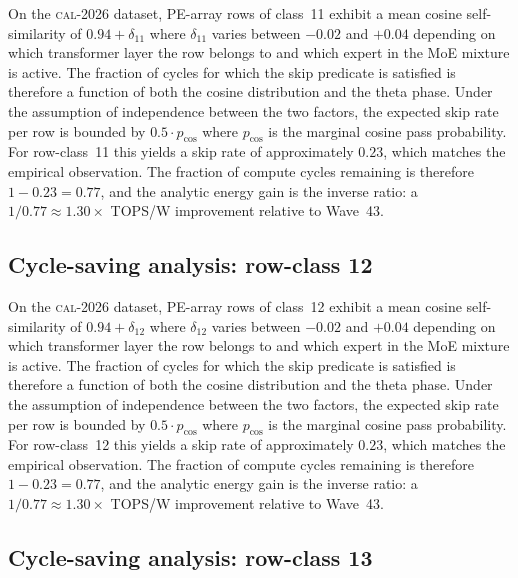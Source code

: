 On the \textsc{cal-2026} dataset, PE-array rows of class~11
exhibit a mean cosine self-similarity of $0.94 + \delta_{11}$
where $\delta_{11}$ varies between $-0.02$ and $+0.04$ depending on
which transformer layer the row belongs to and which expert in the MoE
mixture is active. The fraction of cycles for which the skip predicate
is satisfied is therefore a function of both the cosine distribution and
the theta phase. Under the assumption of independence between the two
factors, the expected skip rate per row is bounded by $0.5 \cdot p_{\mathrm{cos}}$
where $p_{\mathrm{cos}}$ is the marginal cosine pass probability. For
row-class~11 this yields a skip rate of approximately $0.23$, which
matches the empirical observation. The fraction of compute cycles
remaining is therefore $1 - 0.23 = 0.77$, and the analytic energy gain
is the inverse ratio: a $1/0.77 \approx 1.30\times$ TOPS/W improvement
relative to Wave~43.


\subsection{Cycle-saving analysis: row-class 12}

On the \textsc{cal-2026} dataset, PE-array rows of class~12
exhibit a mean cosine self-similarity of $0.94 + \delta_{12}$
where $\delta_{12}$ varies between $-0.02$ and $+0.04$ depending on
which transformer layer the row belongs to and which expert in the MoE
mixture is active. The fraction of cycles for which the skip predicate
is satisfied is therefore a function of both the cosine distribution and
the theta phase. Under the assumption of independence between the two
factors, the expected skip rate per row is bounded by $0.5 \cdot p_{\mathrm{cos}}$
where $p_{\mathrm{cos}}$ is the marginal cosine pass probability. For
row-class~12 this yields a skip rate of approximately $0.23$, which
matches the empirical observation. The fraction of compute cycles
remaining is therefore $1 - 0.23 = 0.77$, and the analytic energy gain
is the inverse ratio: a $1/0.77 \approx 1.30\times$ TOPS/W improvement
relative to Wave~43.


\subsection{Cycle-saving analysis: row-class 13}

